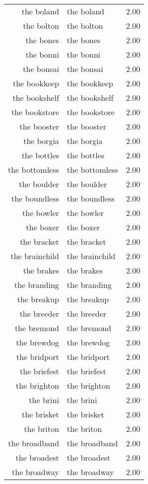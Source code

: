 \begin{table}[ht]
\begin{tabular}{rlr}
  the boland & the boland & 2.00 \\ 
  the bolton & the bolton & 2.00 \\ 
  the bones & the bones & 2.00 \\ 
  the bonni & the bonni & 2.00 \\ 
  the bonsai & the bonsai & 2.00 \\ 
  the bookkeep & the bookkeep & 2.00 \\ 
  the bookshelf & the bookshelf & 2.00 \\ 
  the bookstore & the bookstore & 2.00 \\ 
  the booster & the booster & 2.00 \\ 
  the borgia & the borgia & 2.00 \\ 
  the bottles & the bottles & 2.00 \\ 
  the bottomless & the bottomless & 2.00 \\ 
  the boulder & the boulder & 2.00 \\ 
  the boundless & the boundless & 2.00 \\ 
  the bowler & the bowler & 2.00 \\ 
  the boxer & the boxer & 2.00 \\ 
  the bracket & the bracket & 2.00 \\ 
  the brainchild & the brainchild & 2.00 \\ 
  the brakes & the brakes & 2.00 \\ 
  the branding & the branding & 2.00 \\ 
  the breakup & the breakup & 2.00 \\ 
  the breeder & the breeder & 2.00 \\ 
  the bremond & the bremond & 2.00 \\ 
  the brewdog & the brewdog & 2.00 \\ 
  the bridport & the bridport & 2.00 \\ 
  the briefest & the briefest & 2.00 \\ 
  the brighton & the brighton & 2.00 \\ 
  the brini & the brini & 2.00 \\ 
  the brisket & the brisket & 2.00 \\ 
  the briton & the briton & 2.00 \\ 
  the broadband & the broadband & 2.00 \\ 
  the broadest & the broadest & 2.00 \\ 
  the broadway & the broadway & 2.00 \\ 

\end{tabular}
\end{table}
